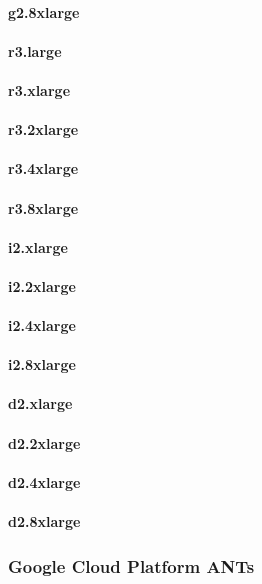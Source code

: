 \documentclass{acm_proc_article-sp}
\begin{document}
\paragraph{g2.8xlarge}
\paragraph{r3.large}
\paragraph{r3.xlarge}
\paragraph{r3.2xlarge}
\paragraph{r3.4xlarge}
\paragraph{r3.8xlarge}
\paragraph{i2.xlarge}
\paragraph{i2.2xlarge}
\paragraph{i2.4xlarge}
\paragraph{i2.8xlarge}
\paragraph{d2.xlarge}
\paragraph{d2.2xlarge}
\paragraph{d2.4xlarge}
\paragraph{d2.8xlarge}
\pagebreak
\subsubsection{Google Cloud Platform ANTs}
\end{document}
